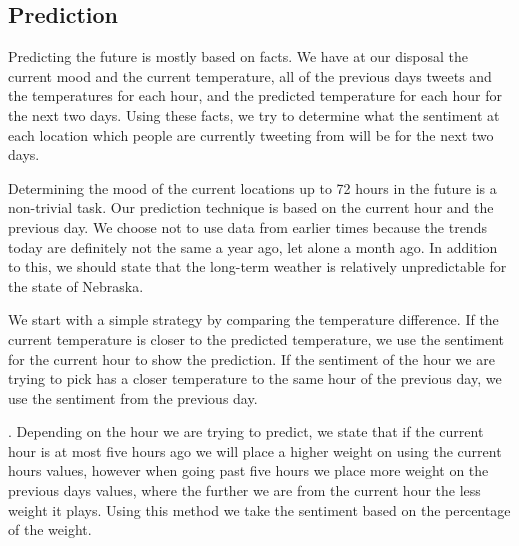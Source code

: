 \subsection{Prediction}
\label{sec:pred}

Predicting the future is mostly based on facts. We have at our disposal the current mood and the current temperature, all of the previous days tweets and the temperatures for each hour, and the predicted temperature for each hour for the next two days. Using these facts, we try to determine what the sentiment at each location which people are currently tweeting from will be for the next two days.

Determining the mood of the current locations up to 72 hours in the future is a non-trivial task. Our prediction technique is based on the current hour and the previous day. We choose not to use data from earlier times because the trends today are definitely not the same a year ago, let alone a month ago. In addition to this, we should state that the long-term weather is relatively unpredictable for the state of Nebraska.

We start with a simple strategy by comparing the temperature difference. If the current temperature is closer to the predicted temperature, we use the sentiment for the current hour to show the prediction. If the sentiment of the hour we are trying to pick has a closer temperature to the same hour of the previous day, we use the sentiment from the previous day.

.
Depending on the hour we are trying to predict, we state that if the current hour is at most five hours ago we will place a higher weight on using the current hours values, however when going past five hours we place more weight on the previous days values, where the further we are from the current hour the less weight it plays. Using this method we take the sentiment based on the percentage of the weight.



